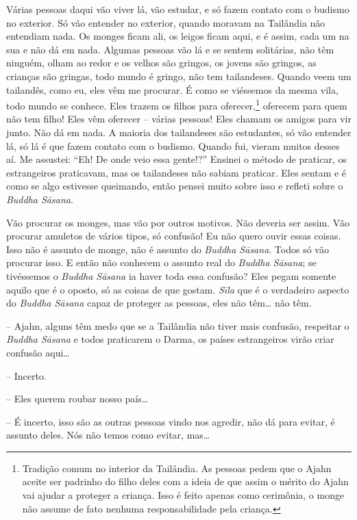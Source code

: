 Várias pessoas daqui vão viver lá, vão estudar, e só fazem contato
com o budismo no exterior. Só vão entender no exterior, quando moravam
na Tailândia não entendiam nada. Os monges ficam ali, os leigos ficam
aqui, e é assim, cada um na sua e não dá em nada. Algumas pessoas vão
lá e se sentem solitárias, não têm ninguém, olham ao redor e os velhos
são gringos, os jovens são gringos, as crianças são gringas, todo mundo
é gringo, não tem tailandeses. Quando veem um tailandês, como eu, eles
vêm me procurar. É como se viéssemos da mesma vila, todo mundo se
conhece. Eles trazem os filhos para oferecer,\footnote{Tradição comum no
interior da Tailândia. As pessoas pedem que o Ajahn aceite ser padrinho
do filho deles com a ideia de que assim o mérito do Ajahn vai ajudar a
proteger a criança. Isso é feito apenas como cerimônia, o monge não
assume de fato nenhuma responsabilidade pela criança.} oferecem para
quem não tem filho! Eles vêm oferecer – várias pessoas! Eles chamam os
amigos para vir junto. Não dá em nada. A maioria dos tailandeses são
estudantes, só vão entender lá, só lá é que fazem contato com o
budismo. Quando fui, vieram muitos desses aí. Me assustei: “Eh! De onde
veio essa gente!?” Ensinei o método de praticar, os estrangeiros
praticavam, mas os tailandeses não sabiam praticar. Eles sentam e é
como se algo estivesse queimando, então pensei muito sobre isso e
refleti sobre o \textit{Buddha Sāsana}. 

Vão procurar os monges, mas vão por outros motivos. Não deveria ser
assim. Vão procurar amuletos de vários tipos, só confusão! Eu não quero
ouvir essas coisas. Isso não é assunto de monge, não é assunto do
\textit{Buddha Sāsana}. Todos só vão procurar isso. E então não
conhecem o assunto real do \textit{Buddha Sāsana}; se tivéssemos o
\textit{Buddha Sāsana} ia haver toda essa confusão? Eles pegam
somente aquilo que é o oposto, só as coisas de que gostam.
\textit{Sīla} que é o verdadeiro aspecto do \textit{Buddha Sāsana}
capaz de proteger as pessoas, eles não têm… não têm. 

-- Ajahn, alguns têm medo que se a Tailândia não tiver mais
confusão, respeitar o \textit{Buddha Sāsana} e todos praticarem o
Darma, os países estrangeiros virão criar confusão aqui…

-- Incerto.

-- Eles querem roubar nosso país…

-- É incerto, isso são as outras pessoas vindo nos agredir, não dá
para evitar, é assunto deles. Nós não temos como evitar, mas…

